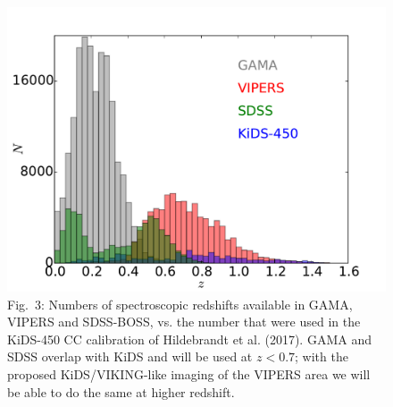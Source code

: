 \documentclass{article}[11pt]
\begin{document}
\begin{figure}
 \begin{minipage}[c]{0.55\textwidth}
  \includegraphics[width=\textwidth]{ESO_prop_plot_zdist.pdf}
  \end{minipage}\hfill
  \begin{minipage}[c]{0.40\textwidth}
    \caption*{Fig.~3: Numbers of spectroscopic redshifts available in GAMA, VIPERS and SDSS-BOSS, vs. the number that were used in the KiDS-450 CC calibration of Hildebrandt et al. (2017). GAMA and SDSS overlap with KiDS and will be used at $z<0.7$; with the proposed KiDS/VIKING-like imaging of the VIPERS area we will be able to do the same at higher redshift.}
  \end{minipage}
\end{figure}
\end{document}

